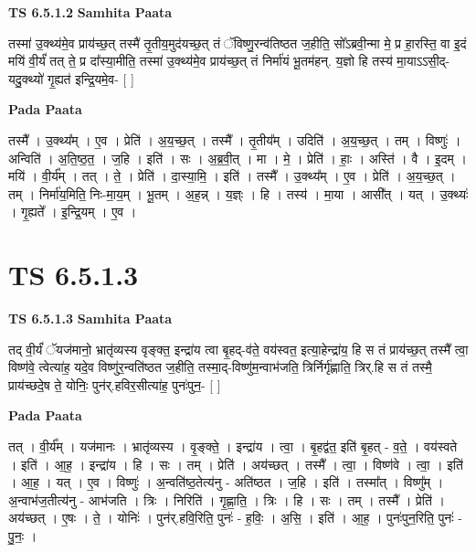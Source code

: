 \documentclass[17pt]{extarticle}
\begin{document}
\textbf{TS 6.5.1.2 } \newline
\textbf{Samhita Paata} \newline

तस्मा॑ उ॒क्थ्य॑मे॒व प्राय॑च्छ॒त् तस्मै॑ तृ॒तीय॒मुद॑यच्छ॒त् तं ॅविष्णु॒रन्व॑तिष्ठत ज॒हीति॒ सो᳚ऽब्रवी॒न्मा मे॒ प्र हा॒रस्ति॒ वा इ॒दं मयि॑ वी॒र्यं॑ तत् ते॒ प्र दा᳚स्या॒मीति॒ तस्मा॑ उ॒क्थ्य॑मे॒व प्राय॑च्छ॒त् तं निर्मा॑यं भू॒तम॑हन्. य॒ज्ञो हि तस्य॑ मा॒याऽऽसी॒द्-यदु॒क्थ्यो॑ गृ॒ह्यत॑ इन्द्रि॒यमे॒व- [  ] \newline

\textbf{Pada Paata} \newline

तस्मै᳚ । उ॒क्थ्य᳚म् । ए॒व । प्रेति॑ । अ॒य॒च्छ॒त् । तस्मै᳚ । तृ॒तीय᳚म् । उदिति॑ । अ॒य॒च्छ॒त् । तम् । विष्णुः॑ । अन्विति॑ । अ॒ति॒ष्ठ॒त॒ । ज॒हि । इति॑ । सः । अ॒ब्र॒वी॒त् । मा । मे॒ । प्रेति॑ । हाः॒ । अस्ति॑ । वै । इ॒दम् । मयि॑ । वी॒र्य᳚म् । तत् । ते॒ । प्रेति॑ । दा॒स्या॒मि॒ । इति॑ । तस्मै᳚ । उ॒क्थ्य᳚म् । ए॒व । प्रेति॑ । अ॒य॒च्छ॒त् । तम् । निर्मा॑य॒मिति॒ निः-मा॒य॒म् । भू॒तम् । अ॒ह॒न्न् । य॒ज्ञ्ः । हि । तस्य॑ । मा॒या । आसी᳚त् । यत् । उ॒क्थ्यः॑ । गृ॒ह्यते᳚ । इ॒न्द्रि॒यम् । ए॒व ।  \newline





\section{ TS 6.5.1.3 }

\textbf{TS 6.5.1.3 } \newline
\textbf{Samhita Paata} \newline

तद् वी॒र्यं॑ ॅयज॑मानो॒ भ्रातृ॑व्यस्य वृङ्क्त॒ इन्द्रा॑य त्वा बृ॒हद्-व॑ते॒ वय॑स्वत॒ इत्या॒हेन्द्रा॑य॒ हि स तं प्राय॑च्छ॒त् तस्मै᳚ त्वा॒ विष्ण॑वे॒ त्वेत्या॑ह॒ यदे॒व विष्णु॑र॒न्वति॑ष्ठत ज॒हीति॒ तस्मा॒द्-विष्णु॑म॒न्वाभ॑जति॒ त्रिर्निर्गृ॑ह्णाति॒ त्रिर्.हि स तं तस्मै॒ प्राय॑च्छदे॒ष ते॒ योनिः॒ पुन॑र्.हविर॒सीत्या॑ह॒ पुनः॑पुन॒- [  ] \newline

\textbf{Pada Paata} \newline

तत् । वी॒र्य᳚म् । यज॑मानः । भ्रातृ॑व्यस्य । वृ॒ङ्क्ते॒ । इन्द्रा॑य । त्वा॒ । बृ॒हद्व॑त॒ इति॑ बृ॒हत् - व॒ते॒ । वय॑स्वते । इति॑ । आ॒ह॒ । इन्द्रा॑य । हि । सः । तम् । प्रेति॑ । अय॑च्छत् । तस्मै᳚ । त्वा॒ । विष्ण॑वे । त्वा॒ । इति॑ । आ॒ह॒ । यत् । ए॒व । विष्णुः॑ । अ॒न्वति॑ष्ठ॒तेत्य॑नु - अति॑ष्ठत । ज॒हि । इति॑ । तस्मा᳚त् । विष्णु᳚म् । अ॒न्वाभ॑ज॒तीत्य॑नु - आभ॑जति । त्रिः । निरिति॑ । गृ॒ह्णा॒ति॒ । त्रिः । हि । सः । तम् । तस्मै᳚ । प्रेति॑ । अय॑च्छत् । ए॒षः । ते॒ । योनिः॑ । पुन॑र्.हवि॒रिति॒ पुनः॑ - ह॒विः॒ । अ॒सि॒ । इति॑ । आ॒ह॒ । पुनः॑पुन॒रिति॒ पुनः॑ - पु॒नः॒ ।  \newline
\end{document}
